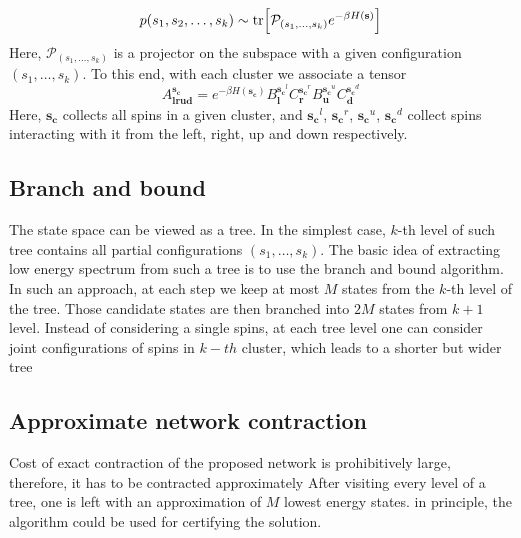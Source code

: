 \begin{equation}
    p(s_1, s_2, \ldots, s_k) \sim \tr[\mathcal{P}_{(s_1, \ldots, s_k)} e^{-\beta H(\mathbf{s})}]
\end{equation}
Here, $\mathcal{P}_{(s_1, \ldots, s_k)}$ is a projector on the subspace with a given configuration $(s_1, \ldots, s_k)$.
To this end, with each cluster we associate a tensor
\begin{equation}
A^{\mathbf{s_c}}_{\mathbf{lrud}} = e^{-\beta H(\mathbf{s_c})} B^{\mathbf{s_c}^l}_\mathbf{l}C^{\mathbf{s_c}^r}_\mathbf{r}B^{\mathbf{s_c}^u}_\mathbf{u}C^{\mathbf{s_c}^d}_\mathbf{d}
\end{equation}
Here, $\mathbf{s_c}$ collects all spins in a given cluster, and $\mathbf{s_c}^l$, $\mathbf{s_c}^r$, $\mathbf{s_c}^u$, $\mathbf{s_c}^d$ collect spins interacting with it from the left, right, up and down respectively.


\subsection{Branch and bound}
The state space can be viewed as a tree. In the simplest case, $k$-th level of such tree contains all partial configurations $(s_1, \ldots, s_k)$. The basic idea of extracting low energy spectrum from such a tree is to use the branch and bound algorithm. In such an approach, at each step we keep at most $M$ states from the $k$-th level of the tree. Those candidate states are then branched into $2M$ states from $k+1$ level. Instead of considering a single spins, at each tree level one can consider joint configurations of spins in $k-th$ cluster,
which leads to a shorter but wider tree 
\subsection{Approximate network contraction}
Cost of exact contraction of the proposed network is prohibitively large, therefore, it has to be contracted approximately
After visiting every level of a tree, one is left with an approximation of $M$ lowest energy states. in principle, the algorithm could be used for certifying the solution.
